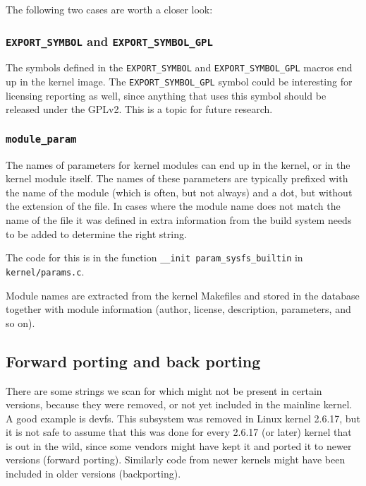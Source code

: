 \documentclass[10pt]{article}
\begin{document}
The following two cases are worth a closer look:

\subsubsection{\texttt{EXPORT\_SYMBOL} and \texttt{EXPORT\_SYMBOL\_GPL}}

The symbols defined in the \texttt{EXPORT\_SYMBOL} and
\texttt{EXPORT\_SYMBOL\_GPL} macros end up in the kernel image. The
\texttt{EXPORT\_SYMBOL\_GPL} symbol could be interesting for licensing
reporting as well, since anything that uses this symbol should be released
under the GPLv2. This is a topic for future research.

\subsubsection{\texttt{module\_param}}

The names of parameters for kernel modules can end up in the kernel, or in the
kernel module itself. The names of these parameters are typically prefixed
with the name of the module (which is often, but not always) and a dot, but
without the extension of the file. In cases where the module name does not
match the name of the file it was defined in extra information from the
build system needs to be added to determine the right string.

The code for this is in the function \texttt{\_\_init param\_sysfs\_builtin} in
\texttt{kernel/params.c}.

Module names are extracted from the kernel Makefiles and stored in the database
together with module information (author, license, description, parameters,
and so on).

\subsection{Forward porting and back porting}

There are some strings we scan for which might not be present in certain
versions, because they were removed, or not yet included in the mainline
kernel. A good example is devfs. This subsystem was removed in Linux kernel
2.6.17, but it is not safe to assume that this was done for every 2.6.17 (or
later) kernel that is out in the wild, since some vendors might have kept it
and ported it to newer versions (forward porting). Similarly code from newer
kernels might have been included in older versions
(backporting).
\end{document}
